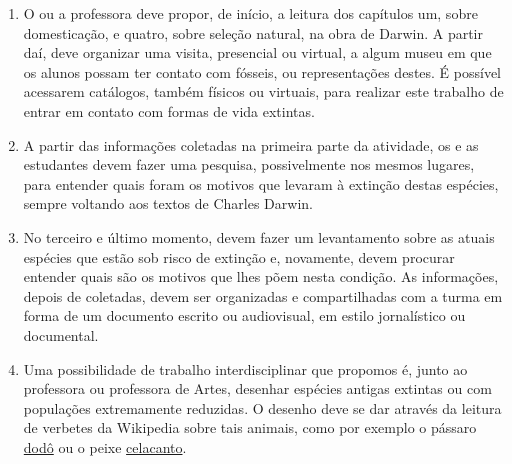 \documentclass[11pt]{extarticle}
\begin{document}
\begin{enumerate}
	\item
	O ou a professora deve propor, de início, a leitura dos capítulos um, sobre domesticação,
	e quatro, sobre seleção natural, na obra de Darwin. 
	A partir daí, deve organizar uma visita, presencial ou virtual, a algum museu em que os alunos possam
	ter contato com fósseis, ou representações destes. É possível acessarem catálogos, também
	físicos ou virtuais, para realizar este trabalho de entrar em contato com formas de vida
	extintas. 


	\item
	A partir das informações coletadas na primeira parte da atividade, os e as estudantes
	devem fazer uma pesquisa, possivelmente nos mesmos lugares, para entender
	quais foram os motivos que levaram à extinção destas espécies, sempre voltando
	aos textos de Charles Darwin.

	\item
	No terceiro e último momento, devem fazer um levantamento sobre as atuais
	espécies que estão sob risco de extinção e, novamente, devem procurar
	entender quais são os motivos que lhes põem nesta condição. As informações,
	depois de coletadas, devem ser organizadas e compartilhadas com a turma em forma 
	de um documento escrito ou audiovisual, em estilo jornalístico ou documental. 

	\item
	Uma possibilidade de trabalho interdisciplinar que propomos é, junto ao
	professora ou professora de Artes, desenhar espécies antigas extintas ou com populações extremamente reduzidas. O desenho deve se dar através da 
	leitura de verbetes da Wikipedia sobre tais animais, como por exemplo o pássaro 
	\href{https://pt.wikipedia.org/wiki/Dod\%C3\%B4\#:~:text=Dod\%C3\%B4\%20ou\%20dod\%C3\%B3\%20(nome\%20cient\%C3\%ADfico,naturais\%20na\%20ilha\%20que\%20habitava}{dodô} ou o peixe 
	\href{https://pt.wikipedia.org/wiki/Celacanto\#:~:text=do\%20mar\%20profundo.-,Descri\%C3\%A7\%C3\%A3o\%20f\%C3\%ADsica,os\%20peixes\%20de\%20nadadeiras\%20lobadas.\&text=Possuem\%20uma\%20nadadeira\%20caudal\%20de,para\%20al\%C3\%A9m\%20da\%20cauda\%20prim\%C3\%A1ria}{celacanto}.

\end{enumerate}
\end{document}
